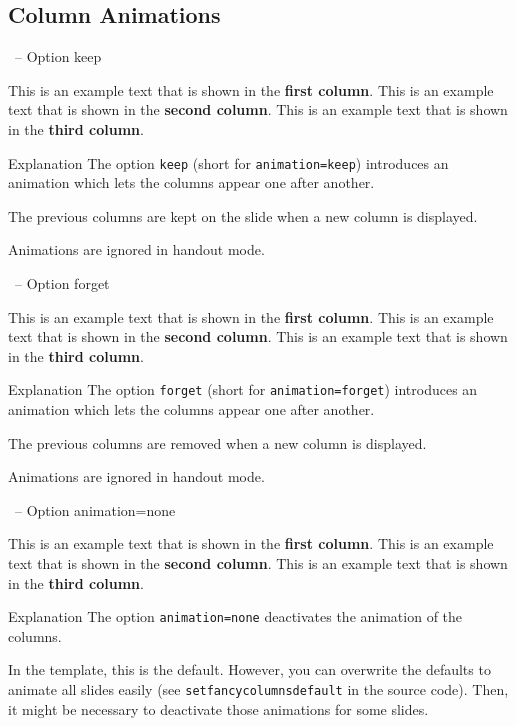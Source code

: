\documentclass[
	aspectratio=169, %
	8pt, %
]{beamer}
\begin{document}
\subsection{Column Animations}
\begin{frame}{\insertsubsection\ -- Option keep}
	\begin{fancycolumns}[columns=3,keep] %
		This is an example text that is shown in the \textbf{first column}.
	\nextcolumn
		This is an example text that is shown in the \textbf{second column}.
	\nextcolumn
		This is an example text that is shown in the \textbf{third column}.
	\end{fancycolumns}
	\vfill
	\begin{note}{Explanation}
		The option \texttt{keep} (short for \texttt{animation=keep}) introduces an animation which lets the columns appear one after another.

		The previous columns are kept on the slide when a new column is displayed.

		Animations are ignored in handout mode.
	\end{note}
\end{frame}

\begin{frame}{\insertsubsection\ -- Option forget}
	\begin{fancycolumns}[columns=3,forget] %
		This is an example text that is shown in the \textbf{first column}.
	\nextcolumn
		This is an example text that is shown in the \textbf{second column}.
	\nextcolumn
		This is an example text that is shown in the \textbf{third column}.
	\end{fancycolumns}
	\vfill
	\begin{note}{Explanation}
		The option \texttt{forget} (short for \texttt{animation=forget}) introduces an animation which lets the columns appear one after another.

		The previous columns are removed when a new column is displayed.

		Animations are ignored in handout mode.
	\end{note}
\end{frame}

\begin{frame}{\insertsubsection\ -- Option animation=none}
	\begin{fancycolumns}[columns=3,animation=none]
		This is an example text that is shown in the \textbf{first column}.
	\nextcolumn
		This is an example text that is shown in the \textbf{second column}.
	\nextcolumn
		This is an example text that is shown in the \textbf{third column}.
	\end{fancycolumns}
	\vfill
	\begin{note}{Explanation}
		The option \texttt{animation=none} deactivates the animation of the columns.

		In the template, this is the default. However, you can overwrite the defaults to animate all slides easily (see \texttt{setfancycolumnsdefault} in the source code). Then, it might be necessary to deactivate those animations for some slides.
	\end{note}
\end{frame}
\end{document}
